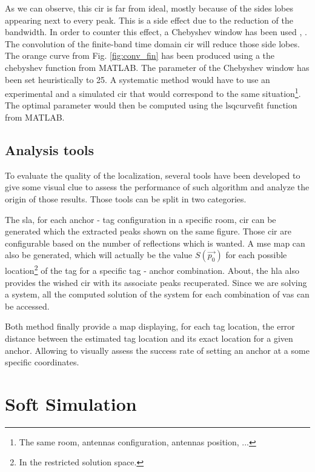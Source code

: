 As we can observe, this \gls{cir} is far from ideal, mostly because of the sides lobes appearing next to every peak. This is a side effect due to the reduction of the bandwidth. In order to counter this effect, a Chebyshev window has been used \cite{lynch1997dolph}, \cite{mathworks}. The convolution of the finite-band time domain \gls{cir} will reduce those side lobes. The orange curve from Fig. \ref{fig:conv_fin} has been produced using a the $\text{chebyshev}$ function from MATLAB. The parameter of the Chebyshev window has been set heuristically to 25. A systematic method would have to use an experimental and a simulated \gls{cir} that would correspond to the same situation\footnote{The same room, antennas configuration, antennas position, ...}. The optimal parameter would then be computed using the $\text{lsqcurvefit}$ function from MATLAB.

\subsection{Analysis tools}

To evaluate the quality of the localization, several tools have been developed to give some visual clue to assess the performance of such algorithm and analyze the origin of those results. Those tools can be split in two categories.
\vspace{2mm}

The \gls{sla}, for each anchor - tag configuration in a specific room, \gls{cir} can be generated which the extracted peaks shown on the same figure. Those \gls{cir} are configurable based on the number of reflections which is wanted. A \gls{mse} map can also be generated, which will actually be the value $S(\vec{p_0})$ for each possible location\footnote{In the restricted solution space.} of the tag for a specific tag - anchor combination. About, the \gls{hla} also provides the wished \gls{cir} with its associate peaks recuperated. Since we are solving a system, all the computed solution of the system for each combination of \glspl{va} can be accessed. 
\vspace{2mm}

Both method finally provide a map displaying, for each tag location, the error distance between the estimated tag location and its exact location for a given anchor. Allowing to visually assess the success rate of setting an anchor at a some specific coordinates.

\section{Soft Simulation}
\label{soft_sim}

